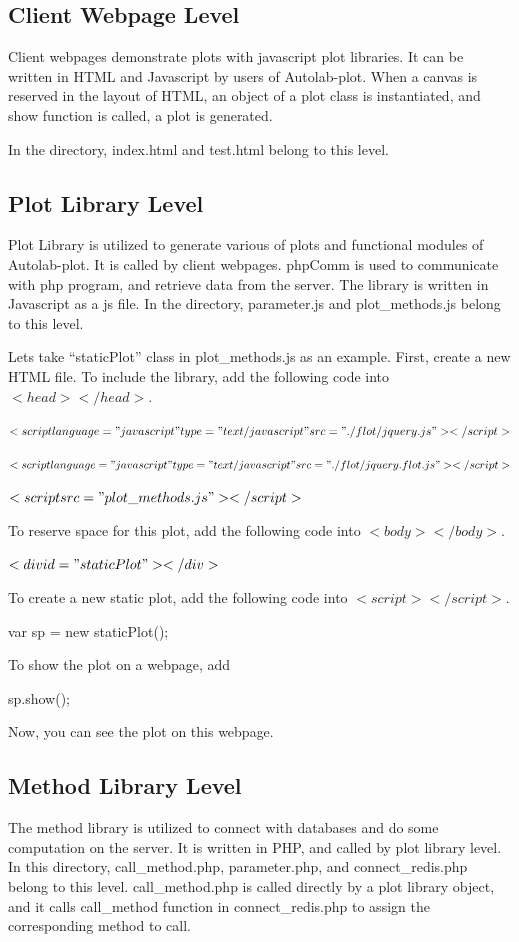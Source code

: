 \documentclass{article}
\begin{document}
\subsection{Client Webpage Level}
Client webpages demonstrate plots with javascript plot libraries.
It can be written in HTML and Javascript by users of Autolab-plot.
When a canvas is reserved in the layout of HTML, an object of a plot class is instantiated, and show function is called, a plot is generated.

In the directory, index.html and test.html belong to this level.

\subsection{Plot Library Level}
Plot Library is utilized to generate various of plots and functional modules of Autolab-plot.
It is called by client webpages.
phpComm is used to communicate with php program, and retrieve data from the server.
The library is written in Javascript as a js file.
In the directory, parameter.js and plot\_methods.js belong to this level.

Lets take ``staticPlot'' class in plot\_methods.js as an example.
First, create a new HTML file.
To include the library, add the following code into $<head></head>$.

$<script language="javascript" type="text/javascript" src="./flot/jquery.js"></script>$

$<script language="javascript" type="text/javascript" src="./flot/jquery.flot.js"></script>$

$<script src="plot\_methods.js"></script>$

To reserve space for this plot, add the following code into $<body></body>$.

$<div id="staticPlot"></div>$

To create a new static plot, add the following code into $<script></script>$.

var sp = new staticPlot();

To show the plot on a webpage, add

sp.show();

Now, you can see the plot on this webpage.

\subsection{Method Library Level}
The method library is utilized to connect with databases and do some computation on the server.
It is written in PHP, and called by plot library level.
In this directory, call\_method.php, parameter.php, and connect\_redis.php belong to this level.
call\_method.php is called directly by a plot library object, and it calls call\_method function in connect\_redis.php to assign the corresponding method to call.
\end{document}
